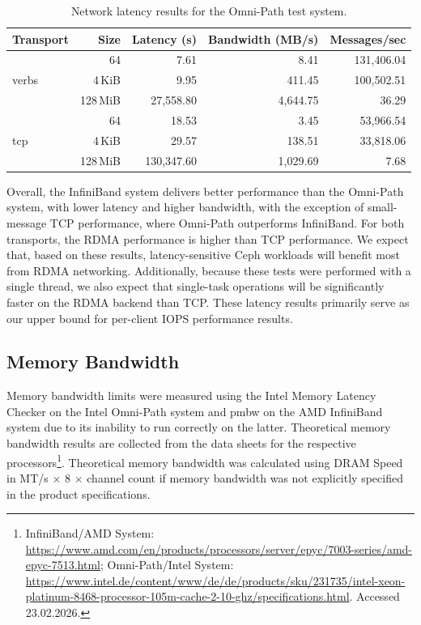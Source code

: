 \begin{table}[H]
\centering
\begin{tabular}{|lrrrr|}
\hline
\textbf{Transport} & \textbf{Size} & \textbf{Latency (\textmu{}s)} & \textbf{Bandwidth (MB/s)} & \textbf{Messages/sec} \\
\hline
\multirow{3}{*}{verbs} & 64   & 7.61  & 8.41 & 131,406.04 \\
                        & 4\,KiB   & 9.95  & 411.45 & 100,502.51 \\
                        & 128\,MiB & 27,558.80 & 4,644.75 & 36.29 \\
\multirow{3}{*}{tcp}   & 64   & 18.53  & 3.45 & 53,966.54 \\
                        & 4\,KiB   & 29.57  & 138.51 & 33,818.06 \\
                        & 128\,MiB & 130,347.60 & 1,029.69 & 7.68 \\
\hline
\end{tabular}
\caption[Omni-Path Latency Results]{Network latency results for the Omni-Path test system.}
\label{tbl:pingpong-latency-opa}
\end{table}

Overall, the InfiniBand system delivers better performance than the Omni-Path system, with lower latency and higher bandwidth, with the exception of small-message \ac{TCP} performance, where Omni-Path outperforms InfiniBand. For both transports, the \ac{RDMA} performance is higher than \ac{TCP} performance. We expect that, based on these results, latency-sensitive Ceph workloads will benefit most from \ac{RDMA} networking. Additionally, because these tests were performed with a single thread, we also expect that single-task operations will be significantly faster on the \ac{RDMA} backend than \ac{TCP}. These latency results primarily serve as our upper bound for per-client \ac{IOPS} performance results.

\subsection{Memory Bandwidth}

Memory bandwidth limits were measured using the Intel Memory Latency Checker on the Intel Omni-Path system and pmbw on the AMD InfiniBand system due to its inability to run correctly on the latter. Theoretical memory bandwidth results are collected from the data sheets for the respective processors\footnote{InfiniBand/AMD System: \url{https://www.amd.com/en/products/processors/server/epyc/7003-series/amd-epyc-7513.html}; Omni-Path/Intel System: \url{https://www.intel.de/content/www/de/de/products/sku/231735/intel-xeon-platinum-8468-processor-105m-cache-2-10-ghz/specifications.html}. Accessed 23.02.2026.}. Theoretical memory bandwidth was calculated using \ac{DRAM} Speed in MT/s $\times$ 8 $\times$ channel count if memory bandwidth was not explicitly specified in the product specifications.

